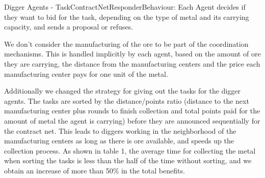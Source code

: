 Digger Agents - TaskContractNetResponderBehaviour:
Each Agent decides if they want to bid for the task, depending on the type of metal and its carrying capacity, and sends a proposal or refuses.

We don’t consider the manufacturing of the ore to be part of the coordination mechanisms. This is handled implicitly by each agent, based on the amount of ore they are carrying, the distance from the manufacturing centers and the price each manufacturing center pays for one unit of the metal.


Additionally we changed the strategy for giving out the tasks for the digger agents. The tasks are sorted by the distance/points ratio (distance to the next manufacturing center plus rounds to finish collection and total points paid for the amount of metal the agent is carrying) before they are announced sequentially for the contract net. This leads to diggers working in the neighborhood of the manufacturing centers as long as there is ore available, and speeds up the collection process. As shown in table 1, the average time for collecting the metal when sorting the tasks is less than the half of the time without sorting, and we obtain an increase of more than 50\% in the total benefits.

